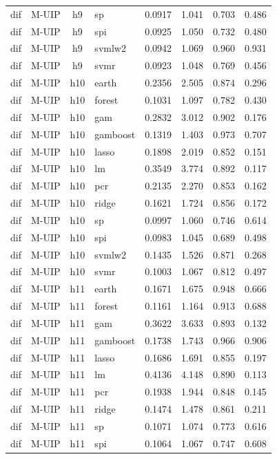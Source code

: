 \begin{ThreePartTable}
\begin{longtable}[t]{llclcccc}
dif & M-UIP & h9 & sp & 0.0917 & 1.041 & 0.703 & 0.486\\
dif & M-UIP & h9 & spi & 0.0925 & 1.050 & 0.732 & 0.480\\
dif & M-UIP & h9 & svmlw2 & 0.0942 & 1.069 & 0.960 & 0.931\\
dif & M-UIP & h9 & svmr & 0.0923 & 1.048 & 0.769 & 0.456\\
\addlinespace
dif & M-UIP & h10 & earth & 0.2356 & 2.505 & 0.874 & 0.296\\
dif & M-UIP & h10 & forest & 0.1031 & 1.097 & 0.782 & 0.430\\
dif & M-UIP & h10 & gam & 0.2832 & 3.012 & 0.902 & 0.176\\
dif & M-UIP & h10 & gamboost & 0.1319 & 1.403 & 0.973 & 0.707\\
dif & M-UIP & h10 & lasso & 0.1898 & 2.019 & 0.852 & 0.151\\
dif & M-UIP & h10 & lm & 0.3549 & 3.774 & 0.892 & 0.117\\
dif & M-UIP & h10 & pcr & 0.2135 & 2.270 & 0.853 & 0.162\\
dif & M-UIP & h10 & ridge & 0.1621 & 1.724 & 0.856 & 0.172\\
dif & M-UIP & h10 & sp & 0.0997 & 1.060 & 0.746 & 0.614\\
dif & M-UIP & h10 & spi & 0.0983 & 1.045 & 0.689 & 0.498\\
dif & M-UIP & h10 & svmlw2 & 0.1435 & 1.526 & 0.871 & 0.268\\
dif & M-UIP & h10 & svmr & 0.1003 & 1.067 & 0.812 & 0.497\\
\addlinespace
dif & M-UIP & h11 & earth & 0.1671 & 1.675 & 0.948 & 0.666\\
dif & M-UIP & h11 & forest & 0.1161 & 1.164 & 0.913 & 0.688\\
dif & M-UIP & h11 & gam & 0.3622 & 3.633 & 0.893 & 0.132\\
dif & M-UIP & h11 & gamboost & 0.1738 & 1.743 & 0.966 & 0.906\\
dif & M-UIP & h11 & lasso & 0.1686 & 1.691 & 0.855 & 0.197\\
dif & M-UIP & h11 & lm & 0.4136 & 4.148 & 0.890 & 0.113\\
dif & M-UIP & h11 & pcr & 0.1938 & 1.944 & 0.848 & 0.145\\
dif & M-UIP & h11 & ridge & 0.1474 & 1.478 & 0.861 & 0.211\\
dif & M-UIP & h11 & sp & 0.1071 & 1.074 & 0.773 & 0.616\\
dif & M-UIP & h11 & spi & 0.1064 & 1.067 & 0.747 & 0.608\\

\end{longtable}
\end{ThreePartTable}

